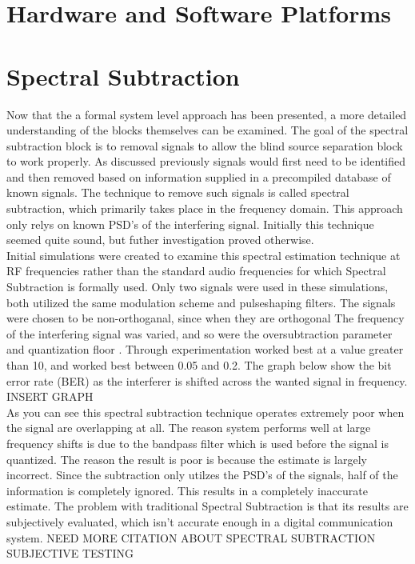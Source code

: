 \section{Hardware and Software Platforms}

\section{Spectral Subtraction}

Now that the a formal system level approach has been presented, a more detailed understanding of the blocks themselves can be examined.  The goal of the spectral subtraction block is to removal signals to allow the blind source separation block to work properly.  As discussed previously signals would first need to be identified and then removed based on information supplied in a precompiled database of known signals.  The technique to remove such signals is called spectral subtraction, which primarily takes place in the frequency domain.  This approach only relys on known PSD's of the interfering signal.  Initially this technique seemed quite sound, but futher investigation proved otherwise.\\

Initial simulations were created to examine this spectral estimation technique at RF frequencies rather than the standard audio frequencies for which Spectral Subtraction is formally used.  Only two signals were used in these simulations, both utilized the same modulation scheme and pulseshaping filters.  The signals were chosen to be non-orthoganal, since when they are orthogonal The frequency of the interfering signal was varied, and so were the oversubtraction parameter \alpha and quantization floor \beta.  Through experimentation \alpha worked best at a value greater than 10, and \beta worked best between 0.05 and 0.2.  The graph below show the bit error rate (BER) as the interferer is shifted across the wanted signal in frequency.\\

INSERT GRAPH\\

As you can see this spectral subtraction technique operates extremely poor when the signal are overlapping at all.  The reason system performs well at large frequency shifts is due to the bandpass filter which is used before the signal is quantized.  The reason the result is poor is because the estimate is largely incorrect.  Since the subtraction only utilzes the PSD's of the signals, half of the information is completely ignored.  This results in a completely inaccurate estimate.  The problem with traditional Spectral Subtraction is that its results are subjectively evaluated, which isn't accurate enough in a digital communication system.  NEED MORE CITATION ABOUT SPECTRAL SUBTRACTION SUBJECTIVE TESTING\\

